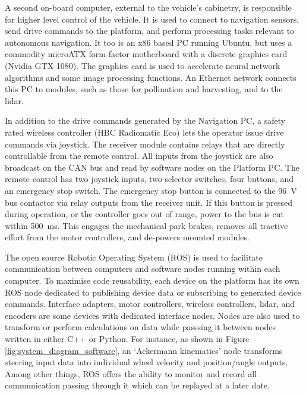 \documentclass[preprint,authoryear,12pt]{elsarticle}
\begin{document}
        A second on-board computer, external to the vehicle's cabinetry, is responsible for higher level control of the vehicle.
        It is used to connect to navigation sensors, send drive commands to the platform, and perform processing tasks relevant to autonomous navigation.
        It too is an x86 based PC running Ubuntu, but uses a commodity microATX form-factor motherboard with a discrete graphics card (Nvidia GTX 1080).
        The graphics card is used to accelerate neural network algorithms and some image processing functions.
        An Ethernet network connects this PC to modules, such as those for pollination and harvesting, and to the lidar.

        In addition to the drive commands generated by the Navigation PC, a safety rated wireless controller (HBC Radiomatic Eco) lets the operator issue drive commands via joystick.
        The receiver module contains relays that are directly controllable from the remote control.
        All inputs from the joystick are also broadcast on the CAN bus and read by software nodes on the Platform PC.
        The remote control has two joystick inputs, two selector switches, four buttons, and an emergency stop switch.
        The emergency stop button is connected to the \SI{96}{\volt} bus contactor via relay outputs from the receiver unit.
        If this button is pressed during operation, or the controller goes out of range, power to the bus is cut within \SI{500}{\milli\second}.
        This engages the mechanical park brakes, removes all tractive effort from the motor controllers, and de-powers mounted modules.

        The open source Robotic Operating System (ROS) is used to facilitate communication between computers and software nodes running within each computer.
        To maximise code reusability, each device on the platform has its own ROS node dedicated to publishing device data or subscribing to generated device commands.
        Interface adapters, motor controllers, wireless controllers, lidar, and encoders are some devices with dedicated interface nodes.
        Nodes are also used to transform or perform calculations on data while passsing it between nodes written in either C++ or Python.
        For instance, as shown in Figure \ref{fig:system_diagram_software}, an `Ackermann kinematics' node transforms steering input data into individual wheel velocity and position/angle outputs.
        Among other things, ROS offers the ability to monitor and record all communication passing through it which can be replayed at a later date.
\end{document}
